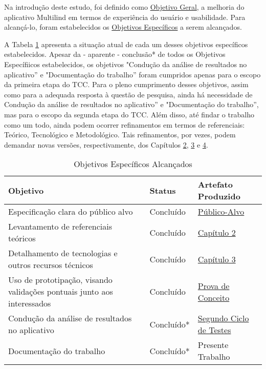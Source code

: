 Na introdução deste estudo, foi definido como \hyperref[sec:Objetivos]{Objetivo Geral}, a melhoria do aplicativo Multilind em termos de experiência do usuário e usabilidade. 
Para alcançá-lo, foram estabelecidos os \hyperref[sec:Objetivos]{Objetivos Específicos} a serem alcançados.

A Tabela \ref{tab10} apresenta a situação atual de cada um desses objetivos específicos estabelecidos. Apesar da - aparente - conclusão* de todos os Objetivos Específiicos 
estabelecidos, os objetivos "Condução da análise de resultados no aplicativo'' e "Documentação do trabalho'' foram cumpridos apenas para o escopo da primeira etapa do TCC. 
Para o pleno cumprimento desses objetivos, assim como para a adequada resposta à questão de pesquisa, ainda há necessidade de Condução da análise de resultados no aplicativo'' 
e "Documentação do trabalho'', mas para o escopo da segunda etapa do TCC. Além disso, até findar o trabalho como um todo, ainda podem ocorrer refinamentos em termos de referenciais: 
Teórico, Tecnológico e Metodológico. Tais refinamentos, por vezes, podem demandar novas versões, respectivamente, dos Capítulos \hyperref[chap:Referencial]{2}, 
\hyperref[chap:ReferencialTech]{3} e \hyperref[chap:Metodologia]{4}.

\begin{table}[h!]
	\centering
	\caption{Objetivos Específicos Alcançados}
	\label{tab10}
	\begin{tabularx}{\textwidth}{p{8cm}|p{2cm}|p{4cm}}
	\hline
    Objetivo                                                        & Status       & Artefato Produzido             \\ \hline
    Especificação clara do público alvo                                                     & Concluído    & \hyperref[Publico-Alvo]{Público-Alvo}              \\
    Levantamento de referenciais teóricos                                          & Concluído    & \hyperref[chap:Referencial]{Capítulo 2}                   \\
    Detalhamento de tecnologias e outros recursos técnicos                                       & Concluído    & \hyperref[chap:ReferencialTech]{Capítulo 3}                    \\
    Uso de prototipação, visando validações pontuais junto aos interessados                                      & Concluído    & \hyperref[sec:Prova de Conceito]{Prova de Conceito}                   \\
    Condução da análise de resultados no aplicativo                                          & Concluído*    & \hyperref[sec:Segundo Ciclo]{Segundo Ciclo de Testes}                    \\
    Documentação do trabalho                       & Concluído*    & Presente Trabalho         \\ \hline
	\end{tabularx}
\end{table}

